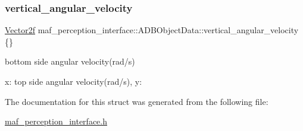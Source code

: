 \subsubsection{\texorpdfstring{vertical\+\_\+angular\+\_\+velocity}{vertical\_angular\_velocity}}
{\footnotesize\ttfamily \hyperlink{structmaf__perception__interface_1_1Vector2f}{Vector2f} maf\+\_\+perception\+\_\+interface\+::\+A\+D\+B\+Object\+Data\+::vertical\+\_\+angular\+\_\+velocity \{\}}



bottom side angular velocity(rad/s) 

x\+: top side angular velocity(rad/s), y\+: 

The documentation for this struct was generated from the following file\+:\begin{DoxyCompactItemize}
\item 
\hyperlink{maf__perception__interface_8h}{maf\+\_\+perception\+\_\+interface.\+h}\end{DoxyCompactItemize}

